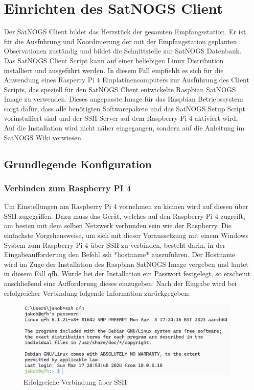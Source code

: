 \chapter{Einrichten des SatNOGS Client}
\label{chap:gs-setup}
Der SatNOGS Client bildet das Herzstück der gesamten Empfangsstation. Er ist für die Ausführung und Koordinierung der mit der Empfangstation geplanten Observationen zuständig und bildet die Schnittstelle zur SatNOGS Datenbank. Das SatNOGS Client Script kann auf einer beliebigen Linux Distribution installiert und ausgeführt werden. In diesem Fall empfiehlt es sich für die Anwendung eines Rasperry Pi 4 Einplatinencomputers zur Ausführung des Client Scripts, das speziell für den SatNOGS Client entwickelte Raspbian SatNOGS Image zu verwenden. Dieses angepasste Image für das Raspbian Betriebssystem sorgt dafür, dass alle benötigten Softwarepakete und das SatNOGS Setup Script vorinstalliert sind und der SSH-Server auf dem Raspberry Pi 4 aktiviert wird. Auf die Installation wird nicht näher eingegangen, sondern auf die Anleitung im SatNOGS Wiki \cite{noauthor_raspberry_nodate} verwiesen. 

\section{Grundlegende Konfiguration}
\subsection{Verbinden zum Raspberry PI 4}
Um Einstellungen am Raspberry Pi 4 vornehmen zu können wird auf diesen über SSH zugegriffen. Dazu muss das Gerät, welches auf den Raspberry Pi 4 zugreift, am besten mit dem selben Netzwerk verbunden sein wie der Raspberry. Die einfachste Vorgehensweise, um sich mit dieser Voraussetzung mit einem Windows System zum Raspberry Pi 4 über SSH zu verbinden, besteht darin, in der Eingabeaufforderung den Befehl \glqq ssh *hostname*\grqq{} auszuführen. Der Hostname wird im Zuge der Installation des Raspbian SatNOGS Image vergeben und lautet in diesem Fall \glqq qfh\grqq{}. Wurde bei der Installation ein Passwort festgelegt, so erscheint anschließend eine Aufforderung dieses einzugeben. Nach der Eingabe wird bei erfolgreicher Verbindung folgende Information zurückgegeben:

\begin{figure} [H]
	\centering
	\includegraphics[width=\linewidth]{../ref/successfull_login.png}
	\caption{Erfolgreiche Verbindung über SSH}
	\label{fig:htrl-uhf(test)successfulllogin}
\end{figure}

